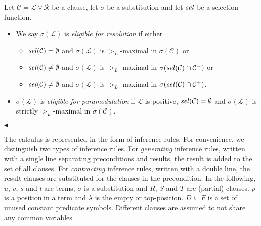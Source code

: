 \documentclass{report}
\begin{document}
\begin{definition}
 \label{def:basics:inferences:eligible}
 Let $\mathcal{C} = \mathcal{L} \vee \mathcal{R}$ be a clause, let
 $\sigma$ be a substitution and let $\mathit{sel}$ be a selection
 function.
 \begin{itemize}
 \item We say $\sigma(\mathcal{L})$ is \emph{eligible for
     resolution} if either
   \begin{itemize}
   \item $\mathit{sel}(\mathcal{C}) = \emptyset$ and $\sigma(\mathcal{L})$
     is $>_L$-maximal in $\sigma(\mathcal{C})$ or
   \item $\mathit{sel}(\mathcal{C}) \not= \emptyset$ and
     $\sigma(\mathcal{L})$ is $>_L$-maximal in
     $\sigma(\mathit{sel}(\mathcal{C})\cap \mathcal{C^-})$ or
   \item $\mathit{sel}(\mathcal{C}) \not= \emptyset$ and
     $\sigma(\mathcal{L})$ is $>_L$-maximal in
     $\sigma(\mathit{sel}(\mathcal{C})\cap \mathcal{C^+})$.
   \end{itemize}
 \item $\sigma(\mathcal{L})$ is \emph{eligible for paramodulation} if
   $\mathcal{L}$ is positive, $\mathit{sel}(\mathcal{C}) = \emptyset$ and
   $\sigma(\mathcal{L})$ is strictly $>_L$-maximal in
   $\sigma(\mathcal{C})$.
 \end{itemize}
 \hfill$\blacktriangleleft$
\end{definition}


The calculus is represented in the form of inference rules. For
convenience, we distinguish two types of inference rules. For
\emph{generating} inference rules, written with a single line
separating preconditions and results, the result is added to the set
of all clauses. For \emph{contracting} inference rules, written with a
double line, the result clauses are substituted for the clauses in the
precondition. In the following, $u$, $v$, $s$ and $t$ are terms,
$\sigma$ is a substitution and $R$, $S$ and $T$ are (partial) clauses.
$p$ is a position in a term and $\lambda$ is the empty or
top-position. $D \subseteq F$ is a set of unused constant predicate
symbols. Different clauses are assumed to not share any common
variables.
\end{document}
